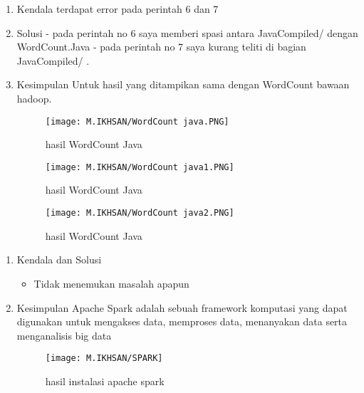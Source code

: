 \clearpage
{}
\begin{enumerate}
\item Kendala
terdapat error pada perintah 6 dan 7

\item Solusi
- pada perintah no 6 saya memberi spasi antara JavaCompiled/ dengan WordCount.Java
- pada perintah no 7 saya kurang teliti di bagian JavaCompiled/ .


\item Kesimpulan
Untuk hasil yang ditampikan sama dengan WordCount bawaan hadoop.

\begin{figure}[!ht]
    \texttt{[image: M.IKHSAN/WordCount java.PNG]}
    \caption{hasil WordCount Java }
    \label{gam:hasil}
    \end{figure}
\begin{figure}[!ht]
    \texttt{[image: M.IKHSAN/WordCount java1.PNG]}
    \caption{hasil WordCount Java }
    \label{gam:hasil}
    \end{figure}
\begin{figure}[!ht]
    \texttt{[image: M.IKHSAN/WordCount java2.PNG]}
    \caption{hasil WordCount Java}
    \label{gam:hasil}
    \end{figure}
\end{enumerate}

\begin{enumerate}
\item Kendala dan Solusi

\begin{itemize}
\item Tidak menemukan masalah apapun
\end{itemize}

\item Kesimpulan
\newline
Apache Spark adalah sebuah framework komputasi yang dapat digunakan untuk mengakses data, memproses data, menanyakan data serta menganalisis big data

\begin{figure}[!ht]
\texttt{[image: M.IKHSAN/SPARK]}
\caption{hasil instalasi apache spark }
\label{gam:hasil instalasi spark}
\end{figure}
\end{enumerate}

